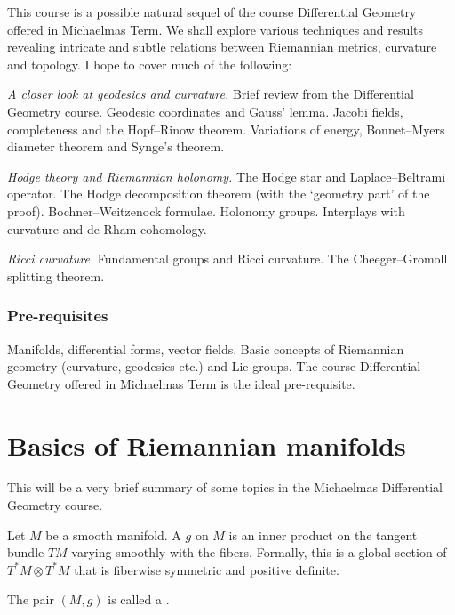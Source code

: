 \documentclass[a4paper]{article}
\begin{document}
\maketitle
{\small
\setlength{\parindent}{0em}
\setlength{\parskip}{1em}
This course is a possible natural sequel of the course Differential Geometry offered in Michaelmas Term. We shall explore various techniques and results revealing intricate and subtle relations between Riemannian metrics, curvature and topology. I hope to cover much of the following:

\emph{A closer look at geodesics and curvature.} Brief review from the Differential Geometry course. Geodesic coordinates and Gauss' lemma. Jacobi fields, completeness and the Hopf--Rinow theorem. Variations of energy, Bonnet--Myers diameter theorem and Synge's theorem.

\emph{Hodge theory and Riemannian holonomy.} The Hodge star and Laplace--Beltrami operator. The Hodge decomposition theorem (with the `geometry part' of the proof). Bochner--Weitzenock formulae. Holonomy groups. Interplays with curvature and de Rham cohomology.

\emph{Ricci curvature.} Fundamental groups and Ricci curvature. The Cheeger--Gromoll splitting theorem.

\subsubsection*{Pre-requisites}
Manifolds, differential forms, vector fields. Basic concepts of Riemannian geometry (curvature, geodesics etc.) and Lie groups. The course Differential Geometry offered in Michaelmas Term is the ideal pre-requisite.
}
\tableofcontents

\section{Basics of Riemannian manifolds}
This will be a very brief summary of some topics in the Michaelmas Differential Geometry course.

\begin{defi}
  Let $M$ be a smooth manifold. A  $g$ on $M$ is an inner product on the tangent bundle $TM$ varying smoothly with the fibers. Formally, this is a global section of $T^*M \otimes T^*M$ that is fiberwise symmetric and positive definite.

  The pair $(M, g)$ is called a .
\end{defi}
\end{document}
